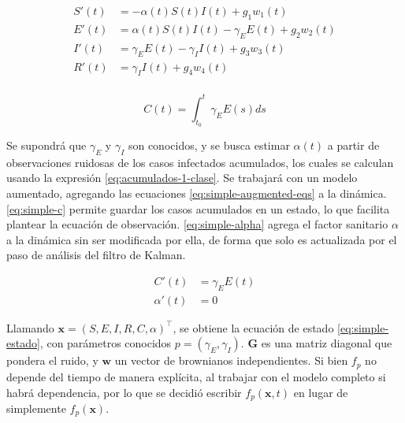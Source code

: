 \begin{equation}\label{eq:contmodel-ruido}
\begin{aligned}
S'(t) &= -\alpha(t) S(t)I(t) + g_1 w_1(t)\\
E'(t) &= \alpha(t) S(t)I(t) - \gamma_E E(t) + g_2 w_2(t)\\
I'(t) &= \gamma_E E(t) - \gamma_{I} I(t) + g_3 w_3(t)\\
R'(t) &= \gamma_{I} I(t) + g_4 w_4(t)\\
\end{aligned}
\end{equation}


\begin{equation}\label{eq:acumulados-1-clase}
C(t) = \int_{t_0}^t \gamma_E E(s) ds
\end{equation}


Se supondrá que \(\gamma_E\) y \(\gamma_I\) son conocidos, y se busca estimar \(\alpha(t)\) a partir de observaciones ruidosas de los casos infectados acumulados, los cuales se calculan usando la expresión \ref{eq:acumulados-1-clase}. Se trabajará con un modelo aumentado, agregando las ecuaciones \ref{eq:simple-augmented-eqs} a la dinámica. \ref{eq:simple-c} permite guardar los casos acumulados en un estado, lo que facilita plantear la ecuación de observación. \ref{eq:simple-alpha} agrega el factor sanitario \(\alpha\) a la dinámica sin ser modificada por ella, de forma que solo es actualizada por el paso de análisis del filtro de Kalman.

\begin{subequations}\label{eq:simple-augmented-eqs}
\begin{align}
C'(t)       &= \gamma_E E(t) \label{eq:simple-c} \\ 
\alpha'(t)  &= 0    \label{eq:simple-alpha}
\end{align}
\end{subequations}

Llamando \(\mathbf{x} = (S, E, I, R, C, \alpha)^{\top}\), se obtiene la ecuación de estado \ref{eq:simple-estado}, con parámetros conocidos \(p = (\gamma_E, \gamma_I)\). \(\mathbf{G}\) es una matriz diagonal que pondera el ruido, y \(\mathbf{w}\) un vector de brownianos independientes. Si bien \(f_p\) no depende del tiempo de manera explícita, al trabajar con el modelo completo si habrá dependencia, por lo que se decidió escribir \(f_p(\mathbf{x}, t)\) en lugar de simplemente \(f_p(\mathbf{x})\).

